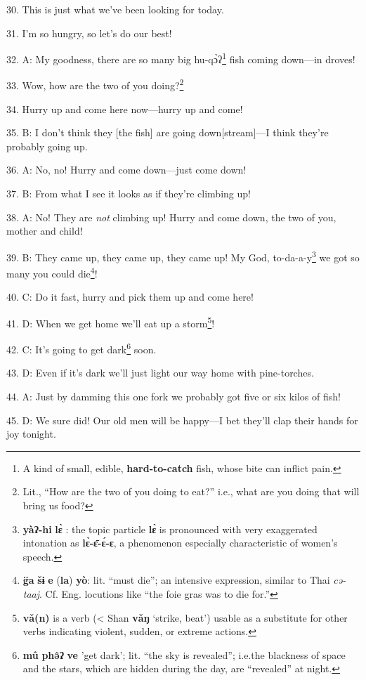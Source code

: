 30. This is just what we've been looking for today.

31. I'm so hungry, so let's do our best!

32. A: My goodness, there are so many big hu-qɔ̀ʔ\footnote{A kind of small, edible, \textbf{hard-to-catch} fish, whose bite can inflict pain.} fish coming down---in
droves!

33. Wow, how are the two of you doing?\footnote{Lit., ``How are the two of you doing to eat?'' i.e., what are you doing that will bring us food?}

34. Hurry up and come here now---hurry up and come!

35. B: I don't think they [the fish] are going down[stream]---I think they're probably
going up.

36. A: No, no! Hurry and come down---just come down!

37. B: From what I see it looks as if they're climbing up!

38. A: No! They are \textit{not} climbing up! Hurry and come down, the two of you,
mother and child!

39. B: They came up, they came up, they came up! My God, to-da-a-y\footnote{\textbf{yàʔ-hi} \textbf{lɛ̀} : the topic particle \textbf{lɛ̀} is pronounced with very exaggerated intonation as \textbf{lɛ̀-ɛ̄-ɛ́-ɛ}, a phenomenon especially characteristic of women's speech.} we got
so many you could die\footnote{\textbf{g̈a} \textbf{šɨ} \textbf{e} (\textbf{la}) \textbf{yò}: lit. ``must die''; an intensive expression, similar to Thai \textit{cə-taaj}. Cf. Eng. locutions like ``the foie gras was to die for.''}!

40. C: Do it fast, hurry and pick them up and come here!

41. D: When we get home we'll eat up a storm\footnote{\textbf{vǎ(n)} is a verb (< Shan \textbf{vǎŋ} `strike, beat') usable as a substitute for other verbs indicating violent, sudden, or extreme actions.}!

42. C: It's going to get dark\footnote{\textbf{mû} \textbf{phə̂ʔ} \textbf{ve} 'get dark'; lit. ``the sky is revealed''; i.e.the blackness of space and the stars, which are hidden during the day, are ``revealed'' at night.} soon.

43. D: Even if it's dark we'll just light our way home with pine-torches.

44. A: Just by damming this one fork we probably got five or six kilos of fish!

45. D: We sure did! Our old men will be happy---I bet they'll clap their hands
for joy tonight.

